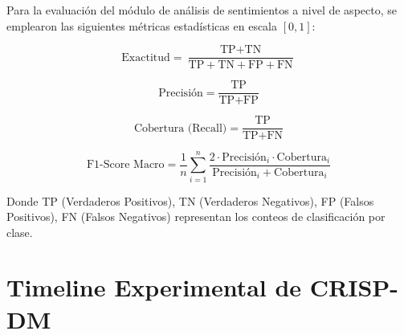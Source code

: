 Para la evaluación del módulo de análisis de sentimientos a nivel de aspecto, se emplearon las siguientes métricas estadísticas en escala $[0, 1]$:

\begin{equation}
\text{Exactitud} = \frac{\text{TP} + \text{TN}}{\text{TP} + \text{TN} + \text{FP} + \text{FN}}
\end{equation}

\begin{equation}
\text{Precisión} = \frac{\text{TP}}{\text{TP} + \text{FP}}
\end{equation}

\begin{equation}
\text{Cobertura (Recall)} = \frac{\text{TP}}{\text{TP} + \text{FN}}
\end{equation}

\begin{equation}
\text{F1-Score Macro} = \frac{1}{n}\sum_{i=1}^{n}\frac{2 \cdot \text{Precisión}_i \cdot \text{Cobertura}_i}{\text{Precisión}_i + \text{Cobertura}_i}
\end{equation}

Donde TP (Verdaderos Positivos), TN (Verdaderos Negativos), FP (Falsos Positivos), FN (Falsos Negativos) representan los conteos de clasificación por clase.

\clearpage

\section{Timeline Experimental de CRISP-DM}

\label{anexo9}

